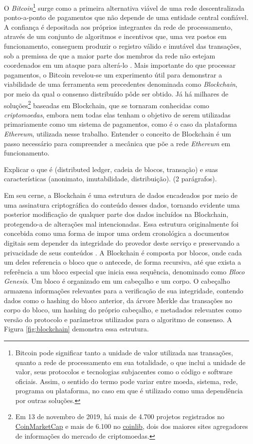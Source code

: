 \documentclass[a4paper,11pt]{article}
\begin{document}
O \emph{Bitcoin}\footnote{Bitcoin pode significar tanto a unidade de valor utilizada nas transações, quanto a rede de processamento em sua totalidade, o que inclui a unidade de valor, seus protocolos e tecnologias subjacentes como o código e software oficiais.
Assim, o sentido do termo pode variar entre moeda, sistema, rede, programa ou plataforma, no caso em que é utilizado como uma dependência por outras soluções.}
surge como a primeira alternativa viável de uma rede descentralizada ponto-a-ponto de pagamentos que não depende de uma entidade central confiável.
A confiança é depositada aos próprios integrantes da rede de processamento, através de um conjunto de algoritmos e incentivos que, uma vez postos em funcionamento, conseguem produzir o registro válido e imutável das transações, sob a premissa de que a maior parte dos membros da rede não estejam coordenados em um ataque para alterá-lo \cite{nakamoto2008bitcoin}.
Mais importante do que processar pagamentos, o Bitcoin revelou-se um experimento útil para demonstrar a viabilidade de uma ferramenta sem precedentes denominada como \emph{Blockchain}, por meio da qual o consenso distribuído pôde ser obtido.
Já há milhares de
soluções\footnote{Em 13 de novembro de 2019, há mais de 4.700 projetos registrados no \href{https://coinmarketcap.com/}{CoinMarketCap} e mais de 6.100 no \href{https://coinlib.io/}{coinlib}, dois dos maiores sites agregadores de informações do mercado de criptomoedas.}
baseadas em Blockchain, que se tornaram conhecidas como \emph{criptomoedas}, embora nem todas elas tenham o objetivo de serem utilizadas primariamente como um sistema de pagamentos, como é o caso da plataforma \emph{Ethereum}, utilizada nesse trabalho.
Entender o conceito de Blockchain é um passo necessário para compreender a mecânica que põe a rede \emph{Ethereum} em funcionamento.

{\color{ForestGreen}Explicar o que é (distributed ledger, cadeia de blocos, transação) e suas características (anonimato, imutabilidade, distribuição). (2 parágrafos).}

Em seu cerne, a Blockchain é uma estrutura de dados encadeados por meio de uma assinatura criptográfica do conteúdo desses dados, tornando evidente uma posterior modificação de qualquer parte dos dados incluídos na Blockchain, protegendo-a de alterações mal intencionadas.
Essa estrutura originalmente foi concebida como uma forma de impor uma ordem cronológica a documentos digitais sem depender da integridade do provedor deste serviço e preservando a privacidade de seus conteúdos \cite{Haber1991}.
A Blockchain é composta por blocos, onde cada um deles referencia o bloco que o antecede, de forma recursiva, até que exista a referência a um bloco especial que inicia essa sequência, denominado como \emph{Bloco Genesis}.
Um bloco é organizado em um cabeçalho e um corpo.
O cabeçalho armazena informações relevantes para a verificação de sua integridade, contendo dados como o hashing do bloco anterior, da árvore Merkle das transações no corpo do bloco, um hashing do próprio cabeçalho, e metadados relevantes como versão do protocolo e parâmetros utilizados para o algoritmo de consenso.
A Figura \ref{fig:blockchain} demonstra essa estrutura.
\end{document}
